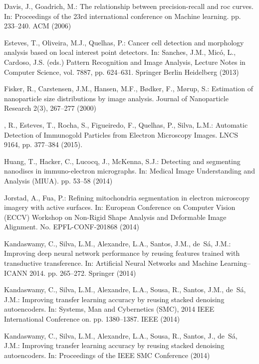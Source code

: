 \documentclass[a4paper,11pt]{article}
\newcommand{\1}{\mathbbm{1}}
\theoremstyle{plain}
\begin{document}
\begin{thebibliography}{10}
Davis, J., Goadrich, M.: The relationship between precision-recall and roc
  curves. In: Proceedings of the 23rd international conference on Machine
  learning. pp. 233--240. ACM (2006)

Esteves, T., Oliveira, M.J., Quelhas, P.: Cancer cell detection and morphology
  analysis based on local interest point detectors. In: Sanches, J.M., Micó,
  L., Cardoso, J.S. (eds.) Pattern Recognition and Image Analysis, Lecture
  Notes in Computer Science, vol. 7887, pp. 624--631. Springer Berlin
  Heidelberg (2013)

Fisker, R., Carstensen, J.M., Hansen, M.F., B{\o}dker, F., M{\o}rup, S.:
  Estimation of nanoparticle size distributions by image analysis. Journal of
  Nanoparticle Research  2(3),  267--277 (2000)

, R., Esteves, T., Rocha, S., Figueiredo, F., Quelhas, P.,
  Silva, L.M.: {Automatic Detection of Immunogold Particles from Electron
  Microscopy Images}. LNCS 9164, pp. 377--384 (2015).

Huang, T., Hacker, C., Lucocq, J., McKenna, S.J.: Detecting and segmenting
  nanodiscs in immuno-electron micrographs. In: Medical Image Understanding and
  Analysis (MIUA). pp. 53--58 (2014)

Jorstad, A., Fua, P.: Refining mitochondria segmentation in electron microscopy
  imagery with active surfaces. In: European Conference on Computer Vision
  (ECCV) Workshop on Non-Rigid Shape Analysis and Deformable Image Alignment.
  No. EPFL-CONF-201868 (2014)

Kandaswamy, C., Silva, L.M., Alexandre, L.A., Santos, J.M., de~S{\'a}, J.M.:
  Improving deep neural network performance by reusing features trained with
  transductive transference. In: Artificial Neural Networks and Machine
  Learning--ICANN 2014. pp. 265--272. Springer (2014)

Kandaswamy, C., Silva, L.M., Alexandre, L.A., Sousa, R., Santos, J.M.,
  de~S{\'a}, J.M.: Improving transfer learning accuracy by reusing stacked
  denoising autoencoders. In: Systems, Man and Cybernetics (SMC), 2014 IEEE
  International Conference on. pp. 1380--1387. IEEE (2014)

Kandaswamy, C., Silva, L.M., Alexandre, L.A., Sousa, R., Santos, J., de~Sá,
  J.M.: Improving transfer learning accuracy by reusing stacked denoising
  autoencoders. In: Proceedings of the IEEE SMC Conference (2014)


\end{thebibliography}
\end{document}
